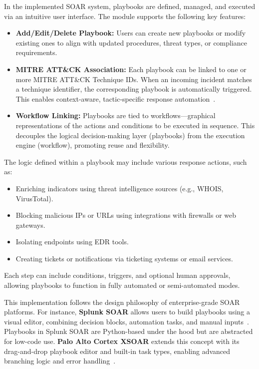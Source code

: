 In the implemented SOAR system, playbooks are defined, managed, and executed via an intuitive user interface. The module supports the following key features:

\begin{itemize}[noitemsep,topsep=0pt]
    \item \textbf{Add/Edit/Delete Playbook:} Users can create new playbooks or modify existing ones to align with updated procedures, threat types, or compliance requirements.
    
    \item \textbf{MITRE ATT\&CK Association:} Each playbook can be linked to one or more MITRE ATT\&CK Technique IDs. When an incoming incident matches a technique identifier, the corresponding playbook is automatically triggered. This enables context-aware, tactic-specific response automation~\cite{mitre}.
    
    \item \textbf{Workflow Linking:} Playbooks are tied to workflows—graphical representations of the actions and conditions to be executed in sequence. This decouples the logical decision-making layer (playbooks) from the execution engine (workflow), promoting reuse and flexibility.
\end{itemize}

The logic defined within a playbook may include various response actions, such as:
\begin{itemize}[noitemsep,topsep=0pt]
    \item Enriching indicators using threat intelligence sources (e.g., WHOIS, VirusTotal).
    \item Blocking malicious IPs or URLs using integrations with firewalls or web gateways.
    \item Isolating endpoints using EDR tools.
    \item Creating tickets or notifications via ticketing systems or email services.
\end{itemize}

Each step can include conditions, triggers, and optional human approvals, allowing playbooks to function in fully automated or semi-automated modes.

This implementation follows the design philosophy of enterprise-grade SOAR platforms. For instance, \textbf{Splunk SOAR} allows users to build playbooks using a visual editor, combining decision blocks, automation tasks, and manual inputs~\cite{splunk}. Playbooks in Splunk SOAR are Python-based under the hood but are abstracted for low-code use. \textbf{Palo Alto Cortex XSOAR} extends this concept with its drag-and-drop playbook editor and built-in task types, enabling advanced branching logic and error handling~\cite{paloalto}.

